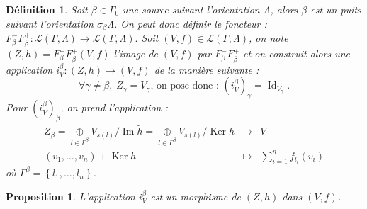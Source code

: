 \documentclass[a4paper,10pt]{article}
\newtheorem{defi}{Définition}[section]
\newtheorem{prop}{Proposition}[section]
\DeclareMathOperator{\Ker}{Ker}
\DeclareMathOperator{\Id}{Id}
\DeclareMathOperator{\Img}{Im}
\begin{document}
\begin{defi}
	Soit $\beta\in\Gamma_{0}$ une source suivant l'orientation $\Lambda$, alors $\beta$ est un puits suivant l'orientation $\sigma_{\beta}\Lambda$. On peut donc définir le foncteur : $F_{\beta}^{-}F_{\beta}^{+}:\mathscr{L}(\Gamma,\Lambda)\rightarrow\mathscr{L}(\Gamma,\Lambda).$ Soit $(V,f)\in\mathscr{L}(\Gamma,\Lambda)$, on note $(Z,h)=F_{\beta}^{-}F_{\beta}^{+}(V,f)$ l'image de $(V,f)$ par $F_{\beta}^{-}F_{\beta}^{+}$ et on construit alors une application $i_{V}^{\beta}:(Z,h)\rightarrow (V,f)$ de la manière suivante :
	\[
		\forall \gamma\neq\beta,\;Z_{\gamma}=V_{\gamma}\text{, on pose donc : }(i_{V}^{\beta})_{\gamma}=\Id_{V_{\gamma}}.
	\]
	Pour $(i_{V}^{\beta})_{\beta}$, on prend l'application : 
	\[
	\begin{array}{ccc}
		Z_{\beta}=\underset{l\in\Gamma^{\beta}}{\oplus} V_{s(l)}/\Img \tilde{h}=\underset{l\in\Gamma^{\beta}}{\oplus} V_{s(l)}/\Ker h & \rightarrow & V \\
		(v_{1},\dots,v_{n})+\Ker h & \mapsto & \sum_{i=1}^{n}f_{l_{i}}(v_{i})
	\end{array}
	\]
	où $\Gamma^{\beta}=\left\{ l_{1},\dots,l_{n} \right\}$.
\end{defi}
\begin{prop}
	L'application $i_{V}^{\beta}$ est un morphisme de $(Z,h)$ dans $(V,f)$.
\end{prop}
\end{document}
